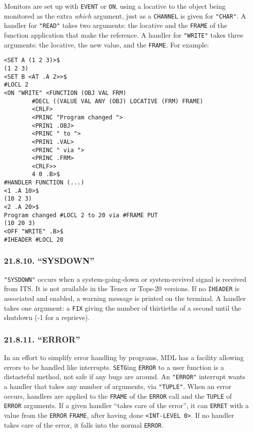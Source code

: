 \documentclass[a4paper,]{article}
\begin{document}
Monitors are set up with \texttt{EVENT} or \texttt{ON}, using a locative to the object being monitored as the extra
\emph{which} argument, just as a \texttt{CHANNEL} is given for \texttt{"CHAR"}. A handler for \texttt{"READ"} takes two
arguments: the locative and the \texttt{FRAME} of the function application that make the reference. A handler for
\texttt{"WRITE"} takes three arguments: the locative, the new value, and the \texttt{FRAME}. For example:

\begin{verbatim}
<SET A (1 2 3)>$
(1 2 3)
<SET B <AT .A 2>>$
#LOCL 2
<ON "WRITE" <FUNCTION (OBJ VAL FRM)
        #DECL ((VALUE VAL ANY (OBJ) LOCATIVE (FRM) FRAME)
        <CRLF>
        <PRINC "Program changed ">
        <PRIN1 .OBJ>
        <PRINC " to ">
        <PRIN1 .VAL>
        <PRINC " via ">
        <PRINC .FRM>
        <CRLF>>
        4 0 .B>$
#HANDLER FUNCTION (...)
<1 .A 10>$
(10 2 3)
<2 .A 20>$
Program changed #LOCL 2 to 20 via #FRAME PUT
(10 20 3)
<OFF "WRITE" .B>$
#IHEADER #LOCL 20
\end{verbatim}

\subsubsection{\texorpdfstring{21.8.10. ``SYSDOWN''}{21.8.10. SYSDOWN}}\label{sysdown}

\texttt{"SYSDOWN"}  occurs when a system-going-down or system-revived signal is received
from ITS. It is not available in the Tenex or Tops-20
versions. If no \texttt{IHEADER} is associated and enabled, a warning message is printed on the terminal. A handler takes
one argument: a \texttt{FIX} giving the number of thirtieths of a second until the shutdown (-1 for a reprieve).

\subsubsection{\texorpdfstring{21.8.11. ``ERROR''}{21.8.11. ERROR}}\label{error-1}

 In an effort to simplify error handling by programs, MDL has a facility allowing errors
to be handled like interrupts. \texttt{SETG}ing \texttt{ERROR} to a user function is a distasteful method, not safe if any
bugs are around. An \texttt{"ERROR"} interrupt wants a handler that takes any number of arguments, via \texttt{"TUPLE"}.
When an error occurs, handlers are applied to the \texttt{FRAME} of the \texttt{ERROR} call and the \texttt{TUPLE} of
\texttt{ERROR} arguments. If a given handler ``takes care of the error'', it can \texttt{ERRET} with a value from the
\texttt{ERROR} \texttt{FRAME}, after having done \texttt{\textless{}INT-LEVEL\ 0\textgreater{}}. If no handler takes care
of the error, it falls into the normal \texttt{ERROR}.
\end{document}
